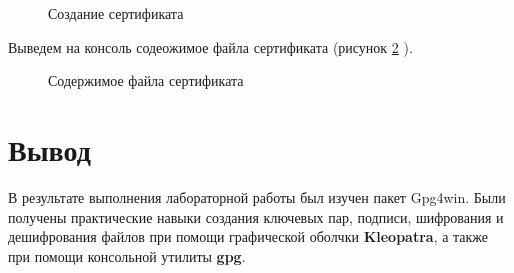 \documentclass[10pt,a4paper]{report}
\begin{document}
\begin{figure}[h]	
\caption{Создание сертификата}
\label{ris:image10}
\end{figure}

Выведем на консоль содеожимое файла сертификата (рисунок \ref{ris:image11} ).\\

\begin{figure}[h]	
\caption{Содержимое файла сертификата}
\label{ris:image11}
\end{figure}

\section{Вывод}
В результате выполнения лабораторной работы был изучен пакет Gpg4win. Были получены практические навыки создания ключевых пар,  подписи, шифрования и дешифрования файлов при помощи графической оболчки \textbf{Kleopatra}, а также при помощи консольной утилиты \textbf{gpg}.
\end{document}
